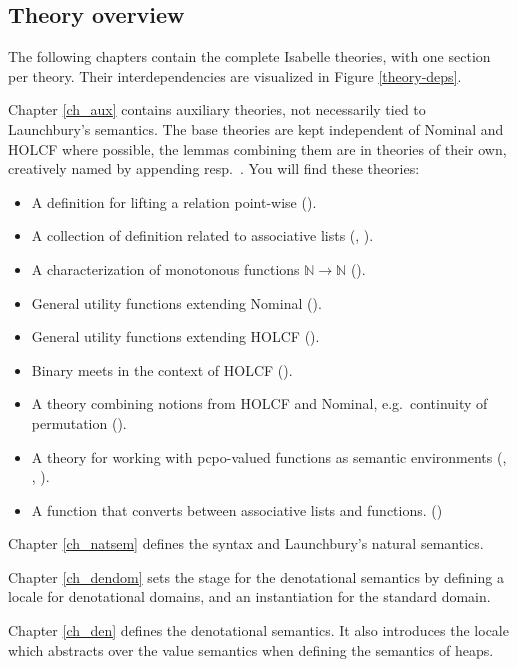 \documentclass[11pt,a4paper,parskip=half]{scrartcl}
\begin{document}
\subsection{Theory overview}

The following chapters contain the complete Isabelle theories, with one section per theory. Their interdependencies are visualized in Figure \ref{theory-deps}.

Chapter \ref{ch_aux} contains auxiliary theories, not necessarily tied to Launchbury's semantics. The base theories are kept independent of Nominal and HOLCF where possible, the lemmas combining them are in theories of their own, creatively named by appending  resp.\ .  You will find these theories:
\begin{itemize}
\item A definition for lifting a relation point-wise ().
\item A collection of definition related to associative lists (, ).
\item A characterization of monotonous functions $\mathbb N \to \mathbb N$ ().
\item General utility functions extending Nominal ().
\item General utility functions extending HOLCF ().
\item Binary meets in the context of HOLCF ().
\item A theory combining notions from HOLCF and Nominal, e.g.\ continuity of permutation ().
\item A theory for working with pcpo-valued functions as semantic environments (, , ).
\item A function  that converts between associative lists and functions. ()
\end{itemize}

Chapter \ref{ch_natsem} defines the syntax and Launchbury's natural semantics.

Chapter \ref{ch_dendom} sets the stage for the denotational semantics by defining a locale  for denotational domains, and an instantiation for the standard domain.

Chapter \ref{ch_den} defines the denotational semantics. It also introduces the locale  which abstracts over the value semantics when defining the semantics of heaps.
\end{document}
